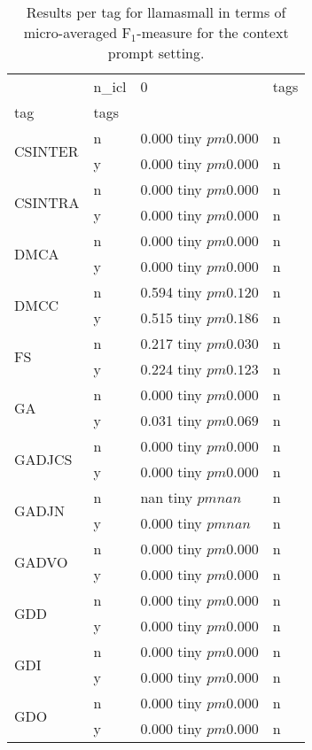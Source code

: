\begin{table}
\caption{Results per tag for llamasmall in terms of micro-averaged F$_1$-measure for the context prompt setting.}
\label{results-context-tags}
\begin{tabular}{llll}
\toprule
 & n_icl & 0 & tags \\
tag & tags &  &  \\
\midrule
\multirow[t]{2}{*}{CSINTER} & n & 0.000 tiny $ pm 0.000$ & n \\
 & y & 0.000 tiny $ pm 0.000$ & n \\
\cline{1-4}
\multirow[t]{2}{*}{CSINTRA} & n & 0.000 tiny $ pm 0.000$ & n \\
 & y & 0.000 tiny $ pm 0.000$ & n \\
\cline{1-4}
\multirow[t]{2}{*}{DMCA} & n & 0.000 tiny $ pm 0.000$ & n \\
 & y & 0.000 tiny $ pm 0.000$ & n \\
\cline{1-4}
\multirow[t]{2}{*}{DMCC} & n & 0.594 tiny $ pm 0.120$ & n \\
 & y & 0.515 tiny $ pm 0.186$ & n \\
\cline{1-4}
\multirow[t]{2}{*}{FS} & n & 0.217 tiny $ pm 0.030$ & n \\
 & y & 0.224 tiny $ pm 0.123$ & n \\
\cline{1-4}
\multirow[t]{2}{*}{GA} & n & 0.000 tiny $ pm 0.000$ & n \\
 & y & 0.031 tiny $ pm 0.069$ & n \\
\cline{1-4}
\multirow[t]{2}{*}{GADJCS} & n & 0.000 tiny $ pm 0.000$ & n \\
 & y & 0.000 tiny $ pm 0.000$ & n \\
\cline{1-4}
\multirow[t]{2}{*}{GADJN} & n & nan tiny $ pm nan$ & n \\
 & y & 0.000 tiny $ pm nan$ & n \\
\cline{1-4}
\multirow[t]{2}{*}{GADVO} & n & 0.000 tiny $ pm 0.000$ & n \\
 & y & 0.000 tiny $ pm 0.000$ & n \\
\cline{1-4}
\multirow[t]{2}{*}{GDD} & n & 0.000 tiny $ pm 0.000$ & n \\
 & y & 0.000 tiny $ pm 0.000$ & n \\
\cline{1-4}
\multirow[t]{2}{*}{GDI} & n & 0.000 tiny $ pm 0.000$ & n \\
 & y & 0.000 tiny $ pm 0.000$ & n \\
\cline{1-4}
\multirow[t]{2}{*}{GDO} & n & 0.000 tiny $ pm 0.000$ & n \\
 & y & 0.000 tiny $ pm 0.000$ & n \\

\end{tabular}
\end{table}
